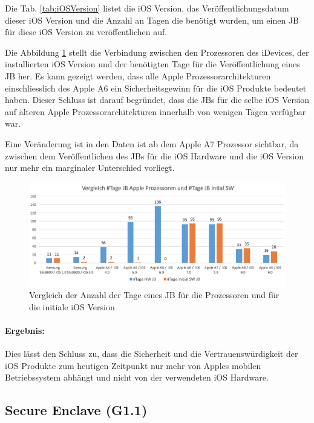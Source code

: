 Die Tab. \ref{tab:iOSVersion} listet die iOS Version, das Veröffentlichungsdatum dieser iOS Version und die Anzahl an Tagen die benötigt wurden, um einen JB für diese iOS Version zu veröffentlichen auf.  \par 
Die Abbildung \ref{fig:VergleichJBProzessorSW} stellt die Verbindung zwischen den Prozessoren des iDevices, der installierten iOS Version und der benötigten Tage für die Veröffentlichung eines JB her. Es kann gezeigt werden, dass alle Apple Prozessorarchitekturen einschliesslich des Apple A6 ein Sicherheitsgewinn für die iOS Produkte bedeutet haben. Dieser Schluss ist darauf begründet, dass die JBs für die selbe iOS Version auf älteren Apple Prozessorarchitekturen innerhalb von wenigen Tagen verfügbar war. \par 

Eine Veränderung ist in den Daten ist ab dem Apple A7 Prozessor sichtbar, da zwischen dem Veröffentlichen des JBs für die iOS Hardware und die iOS Version nur mehr ein marginaler Unterschied vorliegt.
\newpage
\begin{figure}[htbp!]
        \centering
                \includegraphics[scale=0.55]{Bilder/iDeviceJB-SW-HW.png}
         \caption{Vergleich der Anzahl der Tage eines JB für die Prozessoren und für die initiale iOS Version \protect\footnotemark}
        \label{fig:VergleichJBProzessorSW}      
\end{figure}

\paragraph{Ergebnis:} Dies lässt den Schluss zu, dass die Sicherheit und die Vertrauenswürdigkeit der iOS Produkte zum heutigen Zeitpunkt nur mehr von Apples mobilen Betriebssystem abhängt und nicht von der verwendeten iOS Hardware. 
%
\subsection{Secure Enclave  (G1.1)}
\label{sec:Frage1SecureEnclave}
 
